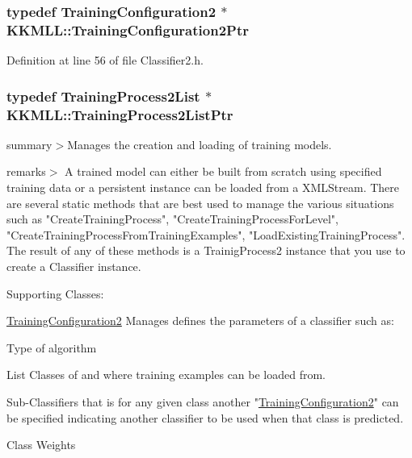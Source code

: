 \subsubsection[{\texorpdfstring{Training\+Configuration2\+Ptr}{TrainingConfiguration2Ptr}}]{\setlength{\rightskip}{0pt plus 5cm}typedef {\bf Training\+Configuration2} $\ast$ {\bf K\+K\+M\+L\+L\+::\+Training\+Configuration2\+Ptr}}\hypertarget{namespace_k_k_m_l_l_a5da4b334417f8c9e4e2fd5924da7fe62}{}\label{namespace_k_k_m_l_l_a5da4b334417f8c9e4e2fd5924da7fe62}


Definition at line 56 of file Classifier2.\+h.

\subsubsection[{\texorpdfstring{Training\+Process2\+List\+Ptr}{TrainingProcess2ListPtr}}]{\setlength{\rightskip}{0pt plus 5cm}typedef {\bf Training\+Process2\+List} $\ast$ {\bf K\+K\+M\+L\+L\+::\+Training\+Process2\+List\+Ptr}}\hypertarget{namespace_k_k_m_l_l_a139987ae75e5ba08c76635f8170f858f}{}\label{namespace_k_k_m_l_l_a139987ae75e5ba08c76635f8170f858f}
summary$>$Manages the creation and loading of training models.

remarks$>$ A trained model can either be built from scratch using specified training data or a persistent instance can be loaded from a X\+M\+L\+Stream. There are several static methods that are best used to manage the various situations such as "Create\+Training\+Process", "Create\+Training\+Process\+For\+Level", "Create\+Training\+Process\+From\+Training\+Examples", "Load\+Existing\+Training\+Process". The result of any of these methods is a Trainig\+Process2 instance that you use to create a Classifier instance.

Supporting Classes\+:
\begin{DoxyItemize}
\item \hyperlink{class_k_k_m_l_l_1_1_training_configuration2}{Training\+Configuration2} Manages defines the parameters of a classifier such as\+:
\begin{DoxyEnumerate}
\item Type of algorithm
\item List Classes of and where training examples can be loaded from.
\item Sub-\/\+Classifiers that is for any given class another "\hyperlink{class_k_k_m_l_l_1_1_training_configuration2}{Training\+Configuration2}" can be specified indicating another classifier to be used when that class is predicted.
\item Class Weights
\end{DoxyEnumerate}
\end{DoxyItemize}

